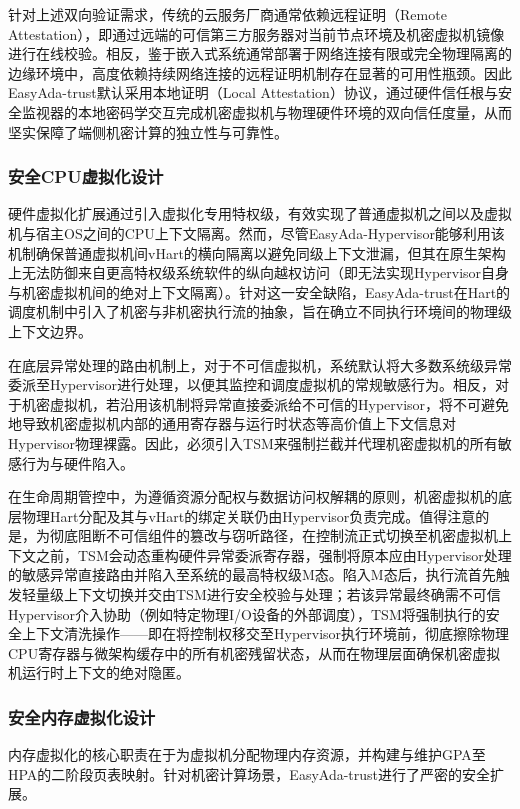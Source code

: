 \documentclass[master, vlined, review]{DissertUESTC}
\begin{document}
	针对上述双向验证需求，传统的云服务厂商通常依赖远程证明（Remote Attestation），即通过远端的可信第三方服务器对当前节点环境及机密虚拟机镜像进行在线校验。相反，鉴于嵌入式系统通常部署于网络连接有限或完全物理隔离的边缘环境中，高度依赖持续网络连接的远程证明机制存在显著的可用性瓶颈。因此EasyAda-trust默认采用本地证明（Local Attestation）协议，通过硬件信任根与安全监视器的本地密码学交互完成机密虚拟机与物理硬件环境的双向信任度量，从而坚实保障了端侧机密计算的独立性与可靠性。
	
	\subsubsection{安全CPU虚拟化设计}
	硬件虚拟化扩展通过引入虚拟化专用特权级，有效实现了普通虚拟机之间以及虚拟机与宿主OS之间的CPU上下文隔离。然而，尽管EasyAda-Hypervisor能够利用该机制确保普通虚拟机间vHart的横向隔离以避免同级上下文泄漏，但其在原生架构上无法防御来自更高特权级系统软件的纵向越权访问（即无法实现Hypervisor自身与机密虚拟机间的绝对上下文隔离）。针对这一安全缺陷，EasyAda-trust在Hart的调度机制中引入了机密与非机密执行流的抽象，旨在确立不同执行环境间的物理级上下文边界。
	
	在底层异常处理的路由机制上，对于不可信虚拟机，系统默认将大多数系统级异常委派至Hypervisor进行处理，以便其监控和调度虚拟机的常规敏感行为。相反，对于机密虚拟机，若沿用该机制将异常直接委派给不可信的Hypervisor，将不可避免地导致机密虚拟机内部的通用寄存器与运行时状态等高价值上下文信息对Hypervisor物理裸露。因此，必须引入TSM来强制拦截并代理机密虚拟机的所有敏感行为与硬件陷入。
	
	在生命周期管控中，为遵循资源分配权与数据访问权解耦的原则，机密虚拟机的底层物理Hart分配及其与vHart的绑定关联仍由Hypervisor负责完成。值得注意的是，为彻底阻断不可信组件的篡改与窃听路径，在控制流正式切换至机密虚拟机上下文之前，TSM会动态重构硬件异常委派寄存器，强制将原本应由Hypervisor处理的敏感异常直接路由并陷入至系统的最高特权级M态。陷入M态后，执行流首先触发轻量级上下文切换并交由TSM进行安全校验与处理；若该异常最终确需不可信Hypervisor介入协助（例如特定物理I/O设备的外部调度），TSM将强制执行的安全上下文清洗操作——即在将控制权移交至Hypervisor执行环境前，彻底擦除物理CPU寄存器与微架构缓存中的所有机密残留状态，从而在物理层面确保机密虚拟机运行时上下文的绝对隐匿。
	
	\subsubsection{安全内存虚拟化设计}
	内存虚拟化的核心职责在于为虚拟机分配物理内存资源，并构建与维护GPA至HPA的二阶段页表映射。针对机密计算场景，EasyAda-trust进行了严密的安全扩展。
	
\end{document}
